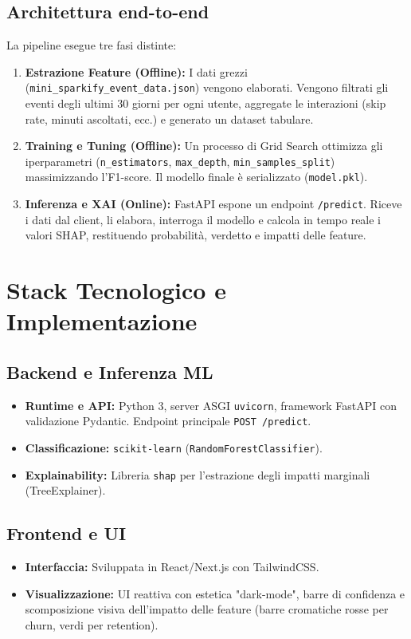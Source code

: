 \documentclass[11pt,a4paper]{article}
\begin{document}
\subsection{Architettura end-to-end}
La pipeline esegue tre fasi distinte:
\begin{enumerate}
    \item \textbf{Estrazione Feature (Offline):} I dati grezzi (\texttt{mini\_sparkify\_event\_data.json}) vengono elaborati. Vengono filtrati gli eventi degli ultimi 30 giorni per ogni utente, aggregate le interazioni (skip rate, minuti ascoltati, ecc.) e generato un dataset tabulare.
    \item \textbf{Training e Tuning (Offline):} Un processo di Grid Search ottimizza gli iperparametri (\texttt{n\_estimators}, \texttt{max\_depth}, \texttt{min\_samples\_split}) massimizzando l'F1-score. Il modello finale è serializzato (\texttt{model.pkl}).
    \item \textbf{Inferenza e XAI (Online):} FastAPI espone un endpoint \texttt{/predict}. Riceve i dati dal client, li elabora, interroga il modello e calcola in tempo reale i valori SHAP, restituendo probabilità, verdetto e impatti delle feature.
\end{enumerate}

\section{Stack Tecnologico e Implementazione}
\subsection{Backend e Inferenza ML}
\begin{itemize}
    \item \textbf{Runtime e API:} Python 3, server ASGI \texttt{uvicorn}, framework FastAPI con validazione Pydantic. Endpoint principale \texttt{POST /predict}.
    \item \textbf{Classificazione:} \texttt{scikit-learn} (\texttt{RandomForestClassifier}).
    \item \textbf{Explainability:} Libreria \texttt{shap} per l'estrazione degli impatti marginali (TreeExplainer).
\end{itemize}

\subsection{Frontend e UI}
\begin{itemize}
    \item \textbf{Interfaccia:} Sviluppata in React/Next.js con TailwindCSS.
    \item \textbf{Visualizzazione:} UI reattiva con estetica "dark-mode", barre di confidenza e scomposizione visiva dell'impatto delle feature (barre cromatiche rosse per churn, verdi per retention).
\end{itemize}
\end{document}
